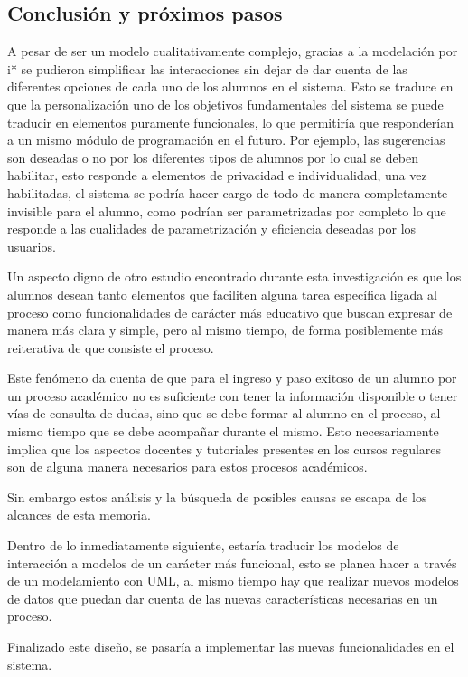     \subsection{Conclusión y próximos pasos}
    \par A pesar de ser un modelo cualitativamente complejo, gracias a la modelación por i* se pudieron simplificar las interacciones sin dejar de dar cuenta de las diferentes opciones de cada uno de los alumnos en el sistema. Esto se traduce en que la personalización uno de los objetivos fundamentales del sistema se puede traducir en elementos puramente funcionales, lo que permitiría que responderían a un mismo módulo de programación en el futuro. Por ejemplo, las sugerencias son deseadas o no por los diferentes tipos de alumnos por lo cual se deben habilitar, esto responde a elementos de privacidad e individualidad, una vez habilitadas, el sistema se podría hacer cargo de todo de manera completamente invisible para el alumno, como podrían ser parametrizadas por completo lo que responde a las cualidades de parametrización y eficiencia deseadas por los usuarios.
    \par Un aspecto digno de otro estudio encontrado durante esta investigación es que los alumnos desean tanto elementos que faciliten alguna tarea específica  ligada al proceso como funcionalidades de carácter más educativo que buscan expresar de manera más clara y simple, pero al mismo tiempo, de forma posiblemente más reiterativa de que consiste el proceso.
    \par Este fenómeno da cuenta de que para el ingreso y paso exitoso de un alumno por un proceso académico no es suficiente con tener la información disponible o tener vías de consulta de dudas, sino que se debe formar al alumno en el proceso, al mismo tiempo que se debe acompañar durante el mismo. Esto necesariamente implica que los aspectos docentes y tutoriales presentes en los cursos regulares son de alguna manera necesarios para estos procesos académicos.
    \par Sin embargo estos análisis y la búsqueda de posibles causas se escapa de los alcances de esta memoria.
    \par Dentro de lo inmediatamente siguiente, estaría traducir los modelos de interacción a modelos de un carácter más funcional, esto se planea hacer a través de un modelamiento con UML, al mismo tiempo hay que realizar nuevos modelos de datos que puedan dar cuenta de las nuevas características necesarias en un proceso.
    \par Finalizado este diseño, se pasaría a implementar las nuevas funcionalidades en el sistema.
